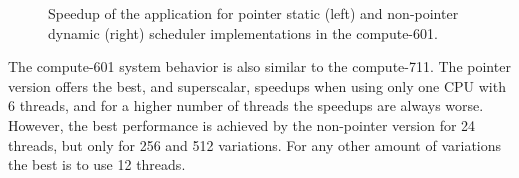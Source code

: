 \begin{figure}[!htp]
	\begin{center}
		\caption{Speedup of the \tth application for pointer static (left) and non-pointer dynamic (right) scheduler implementations in the compute-601.}
		\label{fig:Speedup601}
	\end{center}
\end{figure}

The compute-601 system behavior is also similar to the compute-711. The pointer version offers the best, and superscalar, speedups when using only one CPU with 6 threads, and for a higher number of threads the speedups are always worse. However, the best performance is achieved by the non-pointer version for 24 threads, but only for 256 and 512 variations. For any other amount of variations the best is to use 12 threads.

